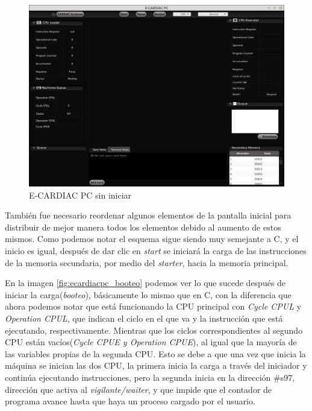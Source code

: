\documentclass[letterpaper,12pt,oneside]{book}
\begin{document}
			
			\begin{figure}[h]		
				\centering
				\includegraphics[scale=0.36]{media/Paralela/ecaridacpc_sininiciar.png}
				\caption{ E-CARDIAC PC sin iniciar}
				\label{fig:ecaridacpc_sininiciar}
			\end{figure}	

			También fue necesario reordenar algunos elementos de la pantalla inicial para distribuir de mejor manera todos los elementos debido
			al aumento de estos mismos. Como podemos notar el esquema sigue siendo muy semejante a C, y el inicio es igual, después de dar clic en
			\textit{start} se iniciará la carga de las instrucciones de la memoria secundaria, por medio del \textit{starter}, hacia la memoria principal.

   
			En la imagen \ref{fig:ecardiacpc_booteo} podemos ver lo que sucede después de iniciar la carga(\textit{booteo}), básicamente lo mismo que en C, con
			la diferencia que ahora podemos notar que está funcionando la CPU principal con \textit{Cycle CPUL} y
			\textit{Operation CPUL}, que indican el ciclo en el que va y la instrucción que está ejecutando, respectivamente. Mientras que los ciclos correspondientes
			al segundo CPU están vacíos(\textit{Cycle CPUE y Operation CPUE}), al igual que la mayoría de las variables propias de la segunda CPU. Esto se debe a que una vez que inicia la máquina se inician
			las dos CPU, la primera inicia la carga  a través del iniciador y continúa ejecutando instrucciones, pero la segunda inicia
			en la dirección \#s97, dirección que activa al \textit{vigilante/waiter}, y que impide que el contador de programa avance hasta que haya
			un proceso cargado por el usuario.
\end{document}
